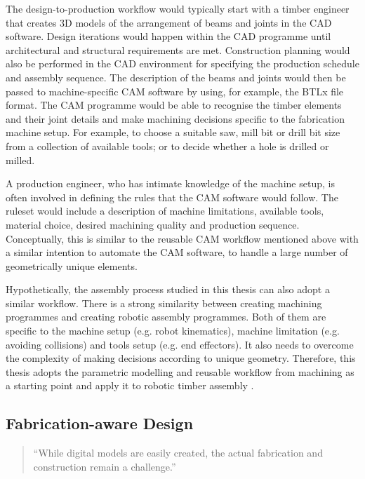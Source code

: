The design-to-production workflow would typically start with a timber engineer that creates 3D models of the arrangement of beams and joints in the CAD software. Design iterations would happen within the CAD programme until architectural and structural requirements are met. Construction planning would also be performed in the CAD environment for specifying the production schedule and assembly sequence. The description of the beams and joints would then be passed to machine-specific CAM software by using, for example, the BTLx file format. The CAM programme would be able to recognise the timber elements and their joint details and make machining decisions specific to the fabrication machine setup. For example, to choose a suitable saw, mill bit or drill bit size from a collection of available tools; or to decide whether a hole is drilled or milled.

A production engineer, who has intimate knowledge of the machine setup, is often involved in defining the rules that the CAM software would follow. The ruleset would include a description of machine limitations, available tools, material choice, desired machining quality and production sequence. Conceptually, this is similar to the reusable CAM workflow mentioned above with a similar intention to automate the CAM software, to handle a large number of geometrically unique elements. 

Hypothetically, the assembly process studied in this thesis can also adopt a similar workflow. There is a strong similarity between creating machining programmes and creating robotic assembly programmes. Both of them are specific to the machine setup (e.g. robot kinematics), machine limitation (e.g. avoiding collisions) and tools setup (e.g. end effectors). It also needs to overcome the complexity of making decisions according to unique geometry. Therefore, this thesis adopts the parametric modelling and reusable workflow from machining as a starting point and apply it to robotic timber assembly . 

\subsection{Fabrication-aware Design}
\label{subsection:introduction-fabrication-aware-design}

\begin{quote}
	``While digital models are easily created, the actual fabrication and construction remain a challenge.'' \parencite{pottmannArchitecturalGeometryFabricationAware2013}
\end{quote}

